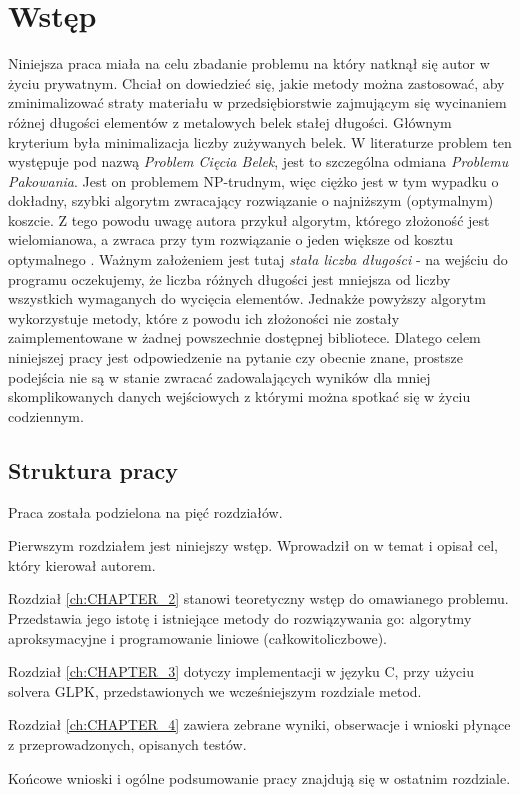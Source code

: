 \chapter{Wstęp}
\thispagestyle{chapterBeginStyle}

Niniejsza praca miała na celu zbadanie problemu na który natknął się autor w życiu prywatnym. Chciał on dowiedzieć się, jakie metody można zastosować, aby zminimalizować straty materiału w przedsiębiorstwie zajmującym się wycinaniem różnej długości elementów z metalowych belek stałej długości. Głównym kryterium była minimalizacja liczby zużywanych belek. W literaturze problem ten występuje pod nazwą \textit{Problem Cięcia Belek}, jest to szczególna odmiana \textit{Problemu Pakowania}. Jest on problemem NP-trudnym, więc ciężko jest w tym wypadku o dokładny, szybki algorytm zwracający rozwiązanie o najniższym (optymalnym) koszcie. Z tego powodu uwagę autora przykuł algorytm, którego złożoność jest wielomianowa, a zwraca przy tym rozwiązanie o jeden większe od kosztu optymalnego \cite{ALG_OPT_1}. Ważnym założeniem jest tutaj \textit{stała liczba długości} - na wejściu do programu oczekujemy, że liczba różnych długości jest mniejsza od liczby wszystkich wymaganych do wycięcia elementów. Jednakże powyższy algorytm wykorzystuje metody, które z powodu ich złożoności nie zostały zaimplementowane w żadnej powszechnie dostępnej bibliotece. 
Dlatego celem niniejszej pracy jest odpowiedzenie na pytanie czy obecnie znane, prostsze podejścia nie są w stanie zwracać zadowalających wyników dla mniej skomplikowanych danych wejściowych z którymi można spotkać się w życiu codziennym. 


\section*{Struktura pracy}
Praca została podzielona na pięć rozdziałów. 

Pierwszym rozdziałem jest niniejszy wstęp. Wprowadził on w temat i opisał cel, który kierował autorem.

Rozdział \ref{ch:CHAPTER_2} stanowi teoretyczny wstęp do omawianego problemu. Przedstawia jego istotę i istniejące metody do rozwiązywania go: algorytmy aproksymacyjne i programowanie liniowe (całkowitoliczbowe).

Rozdział \ref{ch:CHAPTER_3} dotyczy implementacji w języku C, przy użyciu solvera GLPK, przedstawionych we wcześniejszym rozdziale metod.

Rozdział \ref{ch:CHAPTER_4} zawiera zebrane wyniki, obserwacje i wnioski płynące z przeprowadzonych, opisanych testów. 

Końcowe wnioski i ogólne podsumowanie pracy znajdują się w ostatnim rozdziale.





